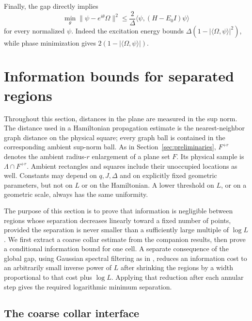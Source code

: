 \documentclass[11pt]{article}
\numberwithin{equation}{section}
\theoremstyle{definition}
\theoremstyle{remark}
\newcommand{\norm}[1]{\lVert #1\rVert}
\begin{document}
Finally, the gap directly implies
\begin{equation}\label{eq:energy-vector}
 \min_\theta\norm{\psi-e^{i\theta}\Omega}^2
 \le\frac{2}{\Delta}\langle\psi,(H-E_0I)\psi\rangle
\end{equation}
for every normalized $\psi$. Indeed the excitation energy bounds
$\Delta(1-|\langle\Omega,\psi\rangle|^2)$, while phase minimization gives
$2(1-|\langle\Omega,\psi\rangle|)$.

\section{Information bounds for separated regions}
\label{sec:information}

Throughout this section, distances in the plane are measured in the sup
norm.  The distance used in a Hamiltonian propagation estimate is the
nearest-neighbor graph distance on the physical square; every graph ball
is contained in the corresponding ambient sup-norm ball.  As in Section~\ref{sec:preliminaries}, $F^{+r}$ denotes the ambient
radius-$r$ enlargement of a plane set $F$.  Its physical sample is
$\Lambda\cap F^{+r}$.  Ambient rectangles and squares include their
unoccupied locations as well.  Constants
may depend on $q,J,\Delta$ and on explicitly fixed geometric parameters,
but not on $L$ or on the Hamiltonian.  A lower threshold on $L$, or on a
geometric scale, always has the same uniformity.

The purpose of this section is to prove that information is negligible
between regions whose separation decreases linearly toward a fixed
number of points, provided the separation is never smaller than a
sufficiently large multiple of $\log L$.  We first extract a coarse
collar estimate from the companion results, then prove a conditional
information bound for one cell.  A separate consequence of the global
gap, using Gaussian spectral filtering as in \cite{Hastings2006Local}, reduces an information cost to an arbitrarily small inverse
power of $L$ after shrinking the regions by a width proportional to that
cost plus $\log L$.  Applying that reduction after each annular step gives the
required logarithmic minimum separation.

\subsection{The coarse collar interface}
\end{document}

